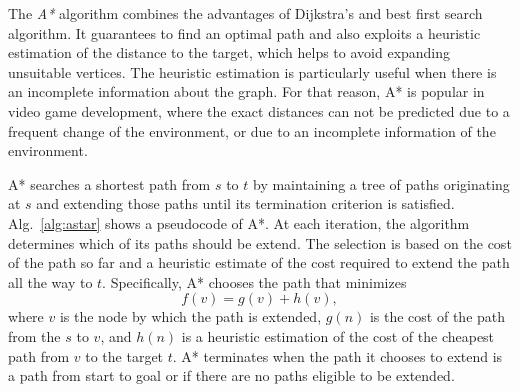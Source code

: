 The \emph{A*} algorithm \cite{hart68} combines the advantages of Dijkstra's and best first search algorithm.
It guarantees to find an optimal path and also exploits a heuristic estimation of the distance to the target, which helps to avoid expanding unsuitable vertices.
The heuristic estimation is particularly useful when there is an incomplete information about the graph.
For that reason, A* is popular in video game development, where the exact distances can not be predicted due to a frequent change of the environment, 
or due to an incomplete information of the environment.

A* searches a shortest path from $s$ to $t$ by maintaining a tree of paths originating at $s$ and extending those paths until its termination criterion is satisfied.
Alg.~\ref{alg:astar} shows a pseudocode of A*.
At each iteration, the algorithm determines which of its paths should be extend. 
The selection is based on the cost of the path so far and a heuristic estimate of the cost required to extend the path all the way to $t$. 
Specifically, A* chooses the path that minimizes
$$
    f(v)=g(v)+h(v),
$$
where $v$ is the node by which the path is extended, $g(n)$ is the cost of the path from the $s$ to $v$, 
and $h(n)$ is a heuristic estimation of the cost of the cheapest path from $v$ to the target $t$. 
A* terminates when the path it chooses to extend is a path from start to goal or if there are no paths eligible to be extended.

